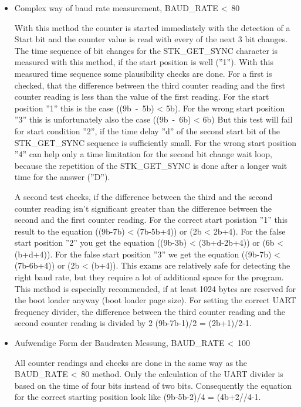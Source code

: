 \begin{itemize}
\item {Complex way of baud rate measurement, BAUD\_RATE \textless~80}

With this method the counter is started immediately with the detection
of a Start bit and the counter value is read with every of the
next 3 bit changes.
The time sequence of bit changes for the STK\_GET\_SYNC character is 
measured with this method, if the start position is well (''1'').
With this measured time sequence some plausibility checks are done.
For a first is checked, that the difference between the third counter
reading and the first counter reading is less than the value
of the first reading.
For the start position ''1'' this is the case ((9b~-~5b) < 5b).
For the wrong start position ''3'' this is unfortunately also the case ((9b~-~6b) < 6b)
But this test will fail for start condition ''2'', if the time delay ''d'' of
the second start bit of the STK\_GET\_SYNC sequence is sufficiently small.
For the wrong start position ''4'' can help only a time limitation for
the second bit change wait loop, because the repetition of the STK\_GET\_SYNC
is done after a longer wait time for the answer (''D''). 

A second test checks, if the difference between the third and the
second counter reading isn't significant greater than the difference
between the second and the first counter reading.
For the correct start posistion ''1'' this result to the equation ((9b-7b) < (7b-5b+4))
or (2b < 2b+4).
For the false start position ''2'' you get the equation ((9b-3b) < (3b+d-2b+4)) or
(6b < (b+d+4)).
For the false start position ''3'' we get the equation ((9b-7b) < (7b-6b+4)) or (2b < (b+4)).
This exams are relatively safe for detecting the right baud rate, but they
require a lot of additional space for the program.
This method is especially recommended, if at least 1024 bytes are reserved
for the boot loader anyway (boot loader page size).
For setting the correct UART frequency divider, the difference between 
the third counter reading and the second counter reading is divided by 2
(9b-7b-1)/2 = (2b+1)/2-1.

\item {Aufwendige Form der Baudraten Messung, BAUD\_RATE \textless~100}

All counter readings and checks are done in the same way as the
BAUD\_RATE \textless~80 method. Only the calculation of
the UART divider is based on the time of four bits instead of two bits.
Consequently the equation for the correct starting position
look like (9b-5b-2)/4 = (4b+2//4-1.

\end{itemize}

